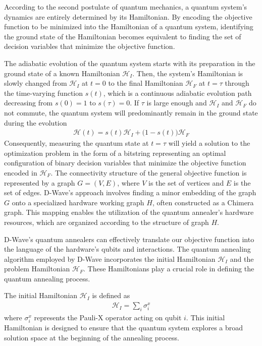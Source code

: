 According to the second postulate of quantum mechanics, a quantum system's dynamics are entirely determined by its Hamiltonian. By encoding the objective function to be minimized into the Hamiltonian of a quantum system, identifying the ground state of the Hamiltonian becomes equivalent to finding the set of decision variables that minimize the objective function.

The adiabatic evolution of the quantum system starts with its preparation in the ground state of a known Hamiltonian $\mathcal{H}_I$. Then, the system's Hamiltonian is slowly changed from $\mathcal{H}_I$ at $t=0$ to the final Hamiltonian $\mathcal{H}_F$ at $t=\tau$ through the time-varying function $s(t)$, which is a continuous adiabatic evolution path decreasing from $s(0) = 1$ to $s(\tau) = 0$. If $\tau$ is large enough and $\mathcal{H}_I$ and $\mathcal{H}_F$ do not commute, the quantum system will predominantly remain in the ground state during the evolution
\begin{align}
    \mathcal{H}(t)=s(t)\mathcal{H}_I+\big(1-s(t)\big)\mathcal{H}_F
\end{align}
Consequently, measuring the quantum state at $t=\tau$ will yield a solution to the optimization problem in the form of a bitstring representing an optimal configuration of binary decision variables that minimize the objective function encoded in $\mathcal{H}_F$. 
The connectivity structure of the general objective function is represented by a graph $G = (V, E)$, where $V$ is the set of vertices and $E$ is the set of edges. D-Wave's approach involves finding a minor embedding of the graph $G$ onto a specialized hardware working graph $H$, often constructed as a Chimera graph. This mapping enables the utilization of the quantum annealer's hardware resources, which are organized according to the structure of graph $H$. 

D-Wave's quantum annealers can effectively translate our objective function into the language of the hardware's qubits and interactions. The quantum annealing algorithm employed by D-Wave incorporates the initial Hamiltonian $\mathcal{H}_I$ and the problem Hamiltonian $\mathcal{H}_F$. These Hamiltonians play a crucial role in defining the quantum annealing process.

The initial Hamiltonian $\mathcal{H}_I$ is defined as
\begin{align}
    \mathcal{H}_I=\sum_i \sigma_i^x
\end{align}
where $\sigma_i^x$ represents the Pauli-X operator acting on qubit $i$. This initial Hamiltonian is designed to ensure that the quantum system explores a broad solution space at the beginning of the annealing process.

